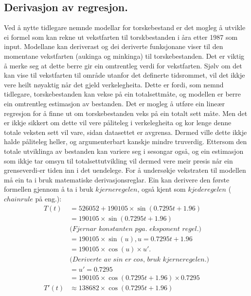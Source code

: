\documentclass{report}
\begin{document}
\subsection{Derivasjon av regresjon.}
Ved å nytte tidlegare nemnde modellar for torskebestand er det mogleg å utvikle ei formel som kan rekne ut vekstfarten til torskbestanden i åra etter 1987 som input.
Modellane kan deriverast og dei deriverte funksjonane viser til den momentane vekstfarten (aukinga og minkinga) til torskebestanden.
Det er viktig å merke seg at dette berre gir ein omtrentleg verdi for vekstfarten.
Sjølv om det kan vise til vekstfarten til område utanfor det definerte tidsrommet, vil det ikkje vere heilt nøyaktig når det gjeld verkelegheita. Dette er fordi, som nemnd tidlegare, torskebestanden kan vekse på ein totalsettmåte, og modellen er berre ein omtrentleg estimasjon av bestanden.
Det er mogleg å utføre ein lineær regresjon for å finne ut om torskebestanden veks på ein totalt sett måte. Men det er ikkje sikkert om dette vil vere påliteleg i verkelegheita og kor lenge denne totale veksten sett vil vare, sidan datasettet er avgrensa.
Dermed ville dette ikkje halde påliteleg heller, og argumenterbart kanskje mindre truverdig. Ettersom den totale utviklinga av bestanden kan variere seg i sesongar også, og ein estimasjon som ikkje tar omsyn til totalsettutvikling vil dermed vere meir presis når ein grenseverdi-er tiden inn i det uendelege.
For å undersøkje vekstraten til modellen må ein ta i bruk matematiske derivasjonsreglar.
Ein kan derivere den første formellen gjennom å ta i bruk $kjerneregelen$, også kjent som $kjederegelen$ ($chainrule$ på eng.):
\begin{align*}
	T(t)  & = 526052+190105\times \sin(0.7295t+1.96)                \\
	      & = 190105 \times \sin(0.7295t+1.96)                      \\
	      & \textit{(Fjernar konstanten pga. eksponent regel.)}     \\
	      & = 190105 \times \sin(u), u=0.7295t+1.96                 \\
	      & = 190105 \times \cos(u) \times u'.                      \\
	      & \textit{(Deriverte av sin er cos, bruk kjerneregelen.)} \\
	      & = u' = 0.7295                                           \\
	      & = 190105 \times \cos(0.7295t+1.96)\times 0.7295         \\
	T'(t) & \approx 138682 \times \cos(0.7295t+1.96)
\end{align*}
\end{document}
